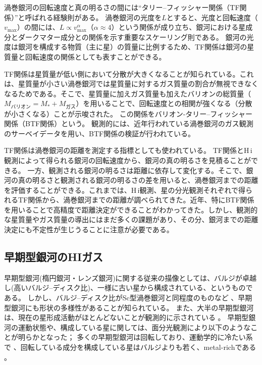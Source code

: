 渦巻銀河の回転速度と真の明るさの間には``タリー--フィッシャー関係（TF関係）''と呼ばれる経験則がある\citep{1977A&A....54..661T}。
渦巻銀河の光度を$L$とすると、光度と回転速度（$v_{\text{max}}$）の間には、$L\propto v_{\text{max}}^\alpha$（$\alpha\approx4）$という関係が成り立ち、銀河における星成分とダークマター成分との関係を示す重要なスケーリング則である。
銀河の光度は銀河を構成する物質（主に星）の質量に比例するため、TF関係は銀河の星質量と回転速度の関係としても表すことができる。

TF関係は星質量が低い側において分散が大きくなることが知られている。これは、星質量が小さい渦巻銀河では星質量に対するガス質量の割合が無視できなくなるためである。そこで、星質量に加えガス質量も加えたバリオンの総質量（$M_{\text{バリオン}} = M_* + M_{\text{ガス}}$）を用いることで、回転速度との相関が強くなる（分散が小さくなる）ことが示唆された\citep[e.g.,][]{2001ApJ...550..212B}。
この関係をバリオン-タリー--フィッシャー関係（BTF関係）という。
観測的には、近年行われている渦巻銀河のガス観測のサーベイデータを用い、BTF関係の検証が行われている\citep[e.g.,][]{2012AJ....143...40M}。

TF関係は渦巻銀河の距離を測定する指標としても使われている。
TF関係とH\,{\sc i}観測によって得られる銀河の回転速度から、銀河の真の明るさを見積ることができる。 一方、観測される銀河の明るさは距離に依存して変化する。そこで、銀河の真の明るさと観測される銀河の明るさの差を用いると、渦巻銀河までの距離を評価することができる。これまでは、H\,{\sc i}観測、星の分光観測それぞれで得られるTF関係から、渦巻銀河までの距離が調べられてきた。近年、特にBTF関係を用いることで高精度で距離決定ができることがわかってきた\citep[e.g.,][]{2001ApJ...550..212B}。しかし、観測的な星質量やガス質量の導出にはまだ多くの課題があり、その分、銀河までの距離決定にも不定性が生じうることに注意が必要である\citep[e.g.,][]{2014AJ....147..134Z}。

\subsection{早期型銀河のHIガス}
\label{sec:早期型銀河の構造・運動・星種族}


早期型銀河(楕円銀河・レンズ銀河)に関する従来の描像としては、バルジが卓越し(高いバルジ--ディスク比)、一様に古い星から構成されている、というものである。
しかし、バルジ--ディスク比がSc型渦巻銀河と同程度のものなど \citep{1951ApJ...113..413S,1970ApJ...160..831S,1976ApJ...206..883V}、早期型銀河にも形状の多様性があることが知られている。
また、大半の早期型銀河は、現在の星形成活動がほとんどないことが観測的に示されている \cite[e.g.,][]{1993PhDT.......172G,2000AJ....119.1645T,2005ApJ...619L.111Y,2007ApJS..173..619K,2010MNRAS.404.1775T}。
早期型銀河の運動状態や、構成している星に関しては、面分光観測により以下のようなことが明らかとなった；
多くの早期型銀河は回転しており、運動学的に冷たい系で \citep{2008MNRAS.390...93K}、回転している成分を構成している星はバルジよりも若く、metal-richである \citep{2010MNRAS.408...97K}。

